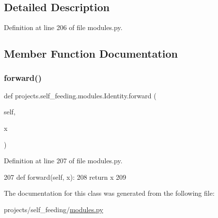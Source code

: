 \subsection{Detailed Description}


Definition at line 206 of file modules.\+py.



\subsection{Member Function Documentation}
\mbox{\label{classprojects_1_1self__feeding_1_1modules_1_1Identity_a1979c4302e23f874290c2a0bc0688edf}} 
\subsubsection{\texorpdfstring{forward()}{forward()}}
{\footnotesize\ttfamily def projects.\+self\+\_\+feeding.\+modules.\+Identity.\+forward (\begin{DoxyParamCaption}\item[{}]{self,  }\item[{}]{x }\end{DoxyParamCaption})}



Definition at line 207 of file modules.\+py.


\begin{DoxyCode}
207     \textcolor{keyword}{def }forward(self, x):
208         \textcolor{keywordflow}{return} x
209 \end{DoxyCode}


The documentation for this class was generated from the following file\+:\begin{DoxyCompactItemize}
\item 
projects/self\+\_\+feeding/\hyperlink{projects_2self__feeding_2modules_8py}{modules.\+py}\end{DoxyCompactItemize}
